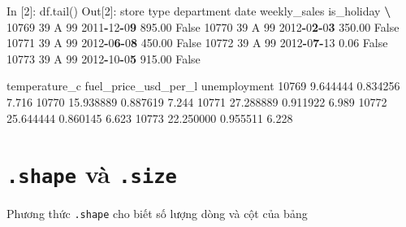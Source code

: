 \documentclass[
]{book}
\newenvironment{Shaded}{\begin{snugshade}}{\end{snugshade}}
\newcommand{\BuiltInTok}[1]{#1}
\newcommand{\DecValTok}[1]{\textcolor[rgb]{0.00,0.00,0.81}{#1}}
\newcommand{\ErrorTok}[1]{\textcolor[rgb]{0.64,0.00,0.00}{\textbf{#1}}}
\newcommand{\FloatTok}[1]{\textcolor[rgb]{0.00,0.00,0.81}{#1}}
\newcommand{\NormalTok}[1]{#1}
\newcommand{\OperatorTok}[1]{\textcolor[rgb]{0.81,0.36,0.00}{\textbf{#1}}}
\newcommand{\VariableTok}[1]{\textcolor[rgb]{0.00,0.00,0.00}{#1}}
\begin{document}
\begin{Shaded}
\begin{Highlighting}[]
\NormalTok{In [}\DecValTok{2}\NormalTok{]: df.tail()}
\NormalTok{Out[}\DecValTok{2}\NormalTok{]:}
\NormalTok{       store }\BuiltInTok{type}\NormalTok{  department        date  weekly\_sales  is\_holiday  }\OperatorTok{\textbackslash{}}
\DecValTok{10769}     \DecValTok{39}\NormalTok{    A          }\DecValTok{99}  \DecValTok{2011}\OperatorTok{{-}}\DecValTok{12}\OperatorTok{{-}}\DecValTok{0}\ErrorTok{9}        \FloatTok{895.00}       \VariableTok{False}   
\DecValTok{10770}     \DecValTok{39}\NormalTok{    A          }\DecValTok{99}  \DecValTok{2012}\OperatorTok{{-}}\DecValTok{0}\ErrorTok{2}\OperatorTok{{-}}\DecValTok{0}\ErrorTok{3}        \FloatTok{350.00}       \VariableTok{False}   
\DecValTok{10771}     \DecValTok{39}\NormalTok{    A          }\DecValTok{99}  \DecValTok{2012}\OperatorTok{{-}}\DecValTok{0}\ErrorTok{6}\OperatorTok{{-}}\DecValTok{0}\ErrorTok{8}        \FloatTok{450.00}       \VariableTok{False}   
\DecValTok{10772}     \DecValTok{39}\NormalTok{    A          }\DecValTok{99}  \DecValTok{2012}\OperatorTok{{-}}\DecValTok{0}\ErrorTok{7}\OperatorTok{{-}}\DecValTok{13}          \FloatTok{0.06}       \VariableTok{False}   
\DecValTok{10773}     \DecValTok{39}\NormalTok{    A          }\DecValTok{99}  \DecValTok{2012}\OperatorTok{{-}}\DecValTok{10}\OperatorTok{{-}}\DecValTok{0}\ErrorTok{5}        \FloatTok{915.00}       \VariableTok{False}   

\NormalTok{       temperature\_c  fuel\_price\_usd\_per\_l  unemployment  }
\DecValTok{10769}       \FloatTok{9.644444}              \FloatTok{0.834256}         \FloatTok{7.716}  
\DecValTok{10770}      \FloatTok{15.938889}              \FloatTok{0.887619}         \FloatTok{7.244}  
\DecValTok{10771}      \FloatTok{27.288889}              \FloatTok{0.911922}         \FloatTok{6.989}  
\DecValTok{10772}      \FloatTok{25.644444}              \FloatTok{0.860145}         \FloatTok{6.623}  
\DecValTok{10773}      \FloatTok{22.250000}              \FloatTok{0.955511}         \FloatTok{6.228} 
\end{Highlighting}
\end{Shaded}

\hypertarget{shape-vuxe0-.size}{%
\section{\texorpdfstring{\texttt{.shape} và \texttt{.size}}{.shape và .size}}\label{shape-vuxe0-.size}}

Phương thức \texttt{.shape} cho biết số lượng dòng và cột của bảng
\end{document}
